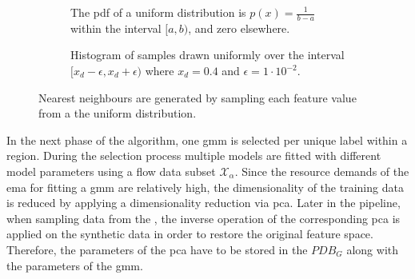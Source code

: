 \documentclass[../../main.tex]{subfiles}
\begin{document}
 \begin{figure}[t!]%
    \centering%
    \begin{subfigure}[b!]{0.49\textwidth}%
        \centering\captionsetup{width=.8\linewidth}%
        \caption{The pdf of a uniform distribution is $p(x) = \frac{1}{b-a}$ within the interval $[a, b)$, and zero elsewhere.}%
        \label{subfig:uniform_dist}%
    \end{subfigure}%
    \hfill%
    \begin{subfigure}[b!]{0.49\textwidth}%
        \centering\captionsetup{width=.8\linewidth}%
        \caption{Histogram of  samples drawn uniformly over the interval $[x_d-\epsilon, x_d+\epsilon)$ where $x_d=0.4$ and $\epsilon=1 \cdot 10^{-2}$.}%
        \label{subfig:hist_nn}%
    \end{subfigure}%
    \caption{Nearest neighbours are generated by sampling each feature value from a the uniform distribution.}%
    \label{fig:uniform_dist_nn}%
\end{figure}%



 
 

 In the next phase of the algorithm, one \acrshort{gmm} is selected per unique label within a region. During the selection process multiple models are fitted with different model parameters using a flow data subset $\mathcal{X}_\alpha$. Since the resource demands of the \gls{ema} for fitting a \acrshort{gmm} are relatively high, the dimensionality of the training data is reduced by applying a dimensionality reduction via \gls{pca}. Later in the pipeline, when sampling data from the , the inverse operation of the corresponding \gls{pca} is applied on the synthetic data in order to restore the original feature space. Therefore, the parameters of the \gls{pca} have to be stored in the $PDB_G$ along with the parameters of the \gls{gmm}. 
 
\end{document}
